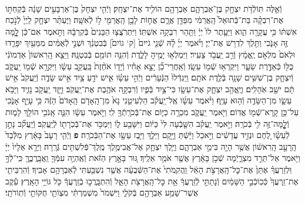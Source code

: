 \documentclass[twoside, openany, parskip=half, 11pt]{book}
\begin{document}
\begin{footnotesize}
\begin{multicols}{2}
\\
וְֿאֵ֛לֶּה תּֽוֹלְֿדֹ֥ת יִצְחָ֖ק בֶּן־אַבְרָהָ֑ם אַבְרָהָ֖ם הוֹלִ֥יד אֶת־יִצְחָֽק׃ וַיְֿהִ֤י יִצְחָק֙ בֶּן־אַרְבָּעִ֣ים שָׁנָ֔ה בְּֿקַחְתּ֣וֹ אֶת־רִבְקָ֗ה בַּת־בְּֿתוּאֵל֙ הָֽאֲרַמִּ֔י מִפַּדַּ֖ן אֲרָ֑ם אֲח֛וֹת לָבָ֥ן הָֽאֲרַמִּ֖י ל֥וֹ לְֿאִשָּֽׁה׃ וַיֶּעְתַּ֨ר יִצְחָ֤ק לַֽיְיָ֙ לְֿנֹ֣כַח אִשְׁתּ֔וֹ כִּ֥י עֲקָרָ֖ה הִ֑וא וַיֵּעָ֤תֶר לוֹ֙ יְיָ֔ וַתַּ֖הַר רִבְקָ֥ה אִשְׁתּֽוֹ׃ וַיִּתְרֹֽצֲצ֤וּ הַבָּנִים֙ בְּֿקִרְבָּ֔הּ וַתֹּ֣אמֶר אִם־כֵּ֔ן לׇׇׇָ֥מָּה זֶּ֖ה אָנֹ֑כִי וַתֵּ֖לֶךְ לִדְר֥שׁ אֶת־יְיָ׃  וַיֹּ֨אמֶר יְיָ֜ לָ֗הּ שְֿׁנֵ֤י גֹייִם֙ [ק‘ גוֹיִם֙] בְּֿבִטְנֵ֔ךְ וּשְׁנֵ֣י לְֿאֻמִּ֔ים מִמֵּעַ֖יִךְ יִפָּרֵ֑דוּ וּלְאֹם֙ מִלְאֹ֣ם יֶֽאֱמָ֔ץ וְֿרַ֖ב יַֽעֲבֹ֥ד צָעִֽיר׃ וַיִּמְלְא֥וּ יָמֶ֖יהָ לָלֶ֑דֶת וְֿהִנֵּ֥ה תוֹמִ֖ם בְּֿבִטְנָֽהּ׃ וַיֵּצֵ֤א הָֽרִאשׁוֹן֙ אַדְמוֹנִ֔י כֻּלּ֖וֹ כְּֿאַדֶּ֣רֶת שֵׂעָ֑ר וַיִּקְרְא֥וּ שְֿׁמ֖וֹ עֵשָֽׂו׃ וְֿאַֽחֲרֵי־כֵ֞ן יָצָ֣א אָחִ֗יו וְֿיָד֤וֹ אֹחֶ֨זֶת֙ בַּֽעֲקֵ֣ב עֵשָׂ֔ו וַיִּקְרָ֥א שְֿׁמ֖וֹ יַֽעֲקֹ֑ב וְֿיִצְחָ֛ק בֶּן־שִׁשִּׁ֥ים שָׁנָ֖ה בְּֿלֶ֥דֶת אֹתָֽם׃  וַֽיִּגְדְּֿלוּ֙ הַנְּֿעָרִ֔ים וַיְֿהִ֣י עֵשָׂ֗ו אִ֛ישׁ יֹדֵ֥עַ צַ֖יִד אִ֣ישׁ שָׂדֶ֑ה וְֿיַֽעֲקֹב֙ אִ֣ישׁ תָּ֔ם ישֵׁ֖ב אֹֽהָלִֽים׃ וַיֶּֽאֱהַ֥ב יִצְחָ֛ק אֶת־עֵשָׂ֖ו כִּי־צַ֣יִד בְּֿפִ֑יו וְֿרִבְקָ֖ה אֹהֶ֥בֶת אֶת־יַֽעֲקֹֽב׃ וַיָּ֥זֶד יַֽעֲקֹ֖ב נָזִ֑יד וַיָּבֹ֥א עֵשָׂ֛ו מִן־הַשָּׂדֶ֖ה וְֿה֥וּא עָיֵֽף׃ וַיֹּ֨אמֶר עֵשָׂ֜ו אֶֽל־יַֽעֲקֹ֗ב הַלְעִיטֵ֤נִי נָא֙ מִן־הָֽאָדֹ֤ם הָֽאָדֹם֙ הַזֶּ֔ה כִּ֥י עָיֵ֖ף אָנֹ֑כִי עַל־כֵּ֥ן קָֽרָא־שְֿׁמ֖וֹ אֱדֽוֹם׃ וַיֹּ֖אמֶר יַֽעֲקֹ֑ב מִכְרָ֥ה כַיּ֛וֹם אֶת־בְּֿכֹרָֽתְֿךָ֖ לִֽי׃ וַיֹּ֣אמֶר עֵשָׂ֔ו הִנֵּ֛ה אָֽנֹכִ֥י הוֹלֵ֖ךְ לָמ֑וּת וְֿלׇׇׇׇׇׇׇׇָֽמָּה־זֶּ֥ה לִ֖י בְּֿכֹרָֽה׃ וַיֹּ֣אמֶר יַֽעֲקֹ֗ב הִשָּׁ֤בְֿעָה לִּי֙ כַּיּ֔וֹם וַיִּשָּׁבַ֖ע ל֑וֹ וַיִּמְכֹּ֥ר אֶת־בְּֿכֹֽרָת֖וֹ לְֿיַֽעֲקֹֽב׃ וְֿיַֽעֲקֹ֞ב נָתַ֣ן לְֿעֵשָׂ֗ו לֶ֚חֶם וּנְזִ֣יד עֲדָשִׁ֔ים וַיֹּ֣אכַל וַיֵּ֔שְֿׁתְּ וַיָּ֖קָם וַיֵּלַ֑ךְ וַיִּ֥בֶז עֵשָׂ֖ו אֶת־הַבְּֿכֹרָֽה׃ \textbf{פ}
וַיְֿהִ֤י רָעָב֙ בָּאָ֔רֶץ מִלְּֿבַד֙ הָֽרָעָ֣ב הָֽרִאשׁ֔וֹן אֲשֶׁ֥ר הָיָ֖ה בִּימֵ֣י אַבְרָהָ֑ם וַיֵּ֧לֶךְ יִצְחָ֛ק אֶל־אֲבִימֶ֥לֶךְ מֶֽלֶךְ־פְּֿלִשְׁתִּ֖ים גְּֿרָֽרָה׃ וַיֵּרָ֤א אֵלָיו֙ יְיָ֔ וַיֹּ֖אמֶר אַל־תֵּרֵ֣ד מִצְרָ֑יְֿמָה שְֿׁכֹ֣ן בָּאָ֔רֶץ אֲשֶׁ֖ר אֹמַ֥ר אֵלֶֽיךָ׃ גּ֚וּר בָּאָ֣רֶץ הַזֹּ֔את וְֿאֶֽהְיֶ֥ה עִמְּֿךָ֖ וַֽאֲבָֽרֲכֶ֑ךָּ כִּֽי־לְֿךָ֣ וּֽלְזַרְעֲךָ֗ אֶתֵּן֙ אֶת־כׇּל־הָֽאֲרָצֹ֣ת הָאֵ֔ל וַֽהֲקִֽמֹתִי֙ אֶת־הַשְּֿׁבֻעָ֔ה אֲשֶׁ֥ר נִשְׁבַּ֖עְתִּי לְֿאַבְרָהָ֥ם אָבִֽיךָ׃ וְֿהִרְבֵּיתִ֤י אֶת־זַֽרְעֲךָ֙ כְּֿכֽוֹכְֿבֵ֣י הַשָּׁמַ֔יִם וְֿנָתַתִּ֣י לְֿזַֽרְעֲךָ֔ אֵ֥ת כׇּל־הָֽאֲרָצֹ֖ת הָאֵ֑ל וְֿהִתְבָּֽרֲכ֣וּ בְֿזַֽרְעֲךָ֔ כֹּ֖ל גּוֹיֵ֥י הָאָֽרֶץ׃ עֵ֕קֶב אֲשֶׁר־שָׁמַ֥ע אַבְרָהָ֖ם בְּֿקֹלִ֑י וַיִּשְׁמֹר֙ מִשְׁמַרְתִּ֔י מִצְוֹתַ֖י חֻקּוֹתַ֥י וְֿתֽוֹרֹתָֽי׃


\end{multicols}
\end{footnotesize}
\end{document}
